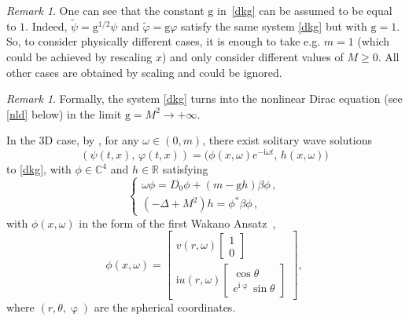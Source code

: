 \documentclass[12pt]{extarticle}
\newcommand{\coupling}{\mathrm{g}}
\newcommand{\jj}{\mathrm{i}}
\def\R{\mathbb{R}}
\newcommand{\C}{\mathbb{C}}\newcommand{\Z}{\mathbb{Z}}
\theoremstyle{plain}
\theoremstyle{remark}
\newtheorem{remark}[lemma]{Remark}
\begin{document}
\begin{remark}
\label{remark-coupling}
One can see that the constant $\coupling$ in~\eqref{dkg}
can be assumed to be equal to $1$.
Indeed, 
$\tilde\psi=\coupling^{1/2}\psi$ and
$\tilde \varphi=\coupling \varphi$ satisfy
the same system \eqref{dkg}
but with $\coupling=1$.
So, to consider physically
different cases, it is
enough to take e.g. $m=1$
(which could be achieved by rescaling $x$)
and only consider different
values of $M\ge 0$.
All other cases are obtained by scaling and could be ignored.
\end{remark}

\begin{remark}\label{remark-close}
Formally, the system \eqref{dkg}
turns into the nonlinear Dirac equation
(see \eqref{nld} below)
in the limit
$\coupling=M^2\to+\infty$.
\end{remark}

In the 3D case,
by \cite{esteban1996stationary},
for any $\omega\in(0,m)$,
there exist solitary wave solutions
\[
    (\psi(t,x),\,\varphi(t,x))
    =\bigl(\phi(x,\omega)e^{-\jj\omega t},\,h(x,\omega)\bigr)
\]
to
\eqref{dkg},
with
$\phi\in\C^4$ and $h\in\R$
satisfying
\begin{equation}\label{dkg-stationary}
    \begin{cases}
    \omega\phi
    =D_0\phi+(m-\coupling h)\beta\phi\,,
    \\
    (-\Delta+M^2)h= \phi^*\beta\phi\,,
    \end{cases}
\end{equation}
with $\phi(x,\omega)$
in the form of the first Wakano Ansatz~\cite{wakano-1966},
\begin{equation}\label{sw-1}
    \phi(x,\omega)
    =
    \begin{bmatrix}
    v(r,\omega)\begin{bmatrix}1\\0\end{bmatrix}
    \\
    \jj u(r,\omega)
    \begin{bmatrix}\cos\theta\\e^{\jj\upvarphi}\sin\theta\end{bmatrix}
    \end{bmatrix}
    ,
\end{equation}
where $(r,\theta,\upvarphi)$
are the spherical coordinates.
\end{document}
